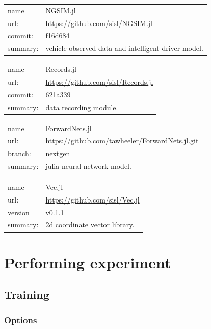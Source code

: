 \documentclass[openany,11pt]{report}%
\begin{document}
\begin{tabular}{|p{2cm}p{12cm}|} \hline
name & NGSIM.jl  \\
url: & \url{https://github.com/sisl/NGSIM.jl} \\
commit: & f16d684 \\
summary: & vehicle observed data and intelligent driver model. \\
\hline
\end{tabular}

\begin{tabular}{|p{2cm}p{12cm}|} \hline
name & Records.jl \\
url: & \url{https://github.com/sisl/Records.jl} \\
commit: & 621a339 \\
summary: & data recording module. \\
\hline
\end{tabular}

\begin{tabular}{|p{2cm}p{12cm}|} \hline
name & ForwardNets.jl \\
url: & \url{https://github.com/tawheeler/ForwardNets.jl.git} \\
branch: & nextgen \\
summary: & julia neural network model. \\
\hline
\end{tabular}

\begin{tabular}{|p{2cm}p{12cm}|} \hline
name & Vec.jl \\
url: & \url{https://github.com/sisl/Vec.jl} \\
version & v0.1.1 \\
summary: & 2d coordinate vector library. \\
\hline
\end{tabular}


\chapter{Performing experiment}

\section{Training}

\subsection{Options}
\end{document}
